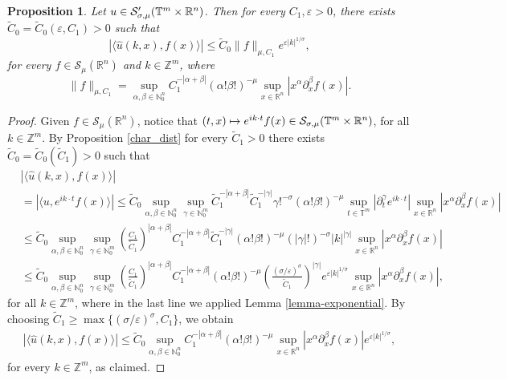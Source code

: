 \documentclass[11pt,reqno]{amsart}
\numberwithin{equation}{section}
\newtheorem{prop}[theorem]{Proposition}
\theoremstyle{definition}
\theoremstyle{definition}
\newcommand{\T}{\mathbb{T}}
\newcommand{\G}{\mathnormal{\mathbb{T}^{m}\times\mathbb{R}^n}}
\newcommand{\R}{\mathbb{R}}
\newcommand{\Z}{\mathbb{Z}}
\newcommand{\N}{\mathbb{N}}
\renewcommand{\S}{\mathcal{S}_{\sigma,\mu}(\G)}
\renewcommand{\SS}{\mathcal{S}'_{\sigma,\mu}(\G)}
\begin{document}
    \begin{prop}\label{proppartialdecaytorusdistrib}
    Let $u\in \SS$. Then for every $C_1,\varepsilon>0$, there exists $\tilde C_0=\tilde C_0(\varepsilon,C_1)>0$ such that
\begin{equation}\label{ineqpartialtorusdistrib}
    |\langle \widehat{u}(k,x),f(x)\rangle|\leq \tilde C_0\|f\|_{\mu,C_1}e^{\varepsilon|k|^{1/\sigma}},
    \end{equation}
    for every $f\in \mathcal{S}_\mu(\R^n)$ and $k\in\Z^m$, where
    \begin{equation}\label{norm_GS}
    \|f\|_{\mu,C_1}=\sup_{\alpha,\beta\in\N_0^n}C_1^{-|\alpha+\beta|}(\alpha!\beta!)^{-\mu}\sup_{x\in\R^n}|x^\alpha\partial_x^\beta f(x)|.
    \end{equation}
    \end{prop}
    \begin{proof}
        Given $f\in\mathcal{S}_\mu(\R^n)$, notice that $(t,x)\mapsto e^{ik\cdot t}f(x)\in\S$, for all $k\in\Z^m$. By Proposition \ref{char_dist} for every $\tilde C_1>0$ there exists $\tilde C_0=\tilde C_0(\tilde C_1)>0$ such that
        \begin{align*}
            & |\langle \widehat{u}(k,x),f(x)\rangle| \\
            & = |\langle u,e^{ik\cdot t}f(x)\rangle| \leq \tilde C_0\sup_{\alpha,\beta\in\N_0^n}\sup_{\gamma\in\N_0^m}\tilde C_1^{-|\alpha+\beta|}\tilde C_1^{-|\gamma|}\gamma!^{-\sigma}(\alpha!\beta!)^{-\mu}\sup_{t\in\T^m}|\partial_t^\gamma e^{ik\cdot t}|\sup_{x\in\R^n}|x^\alpha\partial_x^\beta f(x)|\\
            &\leq \tilde C_0\sup_{\alpha,\beta\in\N_0^n}\sup_{\gamma\in\N_0^m} \left(\frac{{C_1}}{\tilde C_1}\right)^{|\alpha+\beta|}C_1^{-|\alpha+\beta|}\tilde C_1^{-|\gamma|}(\alpha!\beta!)^{-\mu}(|\gamma|!)^{-\sigma}|k|^{|\gamma|} \sup_{x\in\R^n}|x^\alpha\partial_x^\beta f(x)| \\
            &\leq \tilde C_0\sup_{\alpha,\beta\in\N_0^n}\sup_{\gamma\in\N_0^m} \left(\frac{{C_1}}{\tilde C_1}\right)^{|\alpha+\beta|}C_1^{-|\alpha+\beta|}(\alpha!\beta!)^{-\mu}\left(\frac{(\sigma/\varepsilon)^{\sigma}}{\tilde C_1}\right)^{|\gamma|} e^{\varepsilon|k|^{1/\sigma}}\sup_{x\in\R^n}|x^\alpha\partial_x^\beta f(x)|,
        \end{align*}
        for all $k\in\Z^m$, where in the last line we applied Lemma \ref{lemma-exponential}. By choosing $\tilde C_1\geq \max\{(\sigma/\varepsilon)^\sigma,C_1\}$, we obtain
        \begin{align*}
            |\langle \widehat{u}(k,x),f(x)\rangle| \leq  \tilde C_0\sup_{\alpha,\beta\in\N_0^n}C_1^{-|\alpha+\beta|}(\alpha!\beta!)^{-\mu} \sup_{x\in\R^n}|x^\alpha\partial_x^\beta f(x)|e^{\varepsilon|k|^{1/\sigma}},
            \end{align*}
            for every $k\in\Z^m$, as claimed.
    \end{proof}
\end{document}
